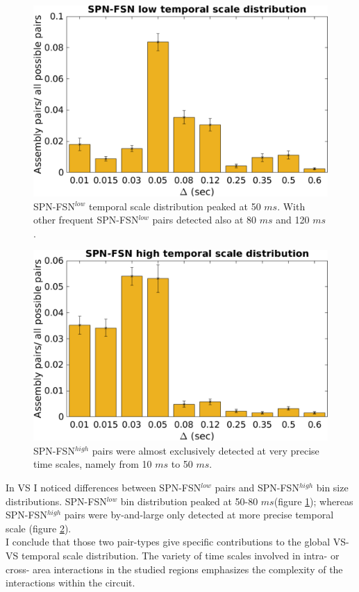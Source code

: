 \begin{figure}
    \centering
    \includegraphics[scale=0.54]{figures/SPN_FSNlow1.pdf}
    \caption{SPN-FSN$^{low}$ temporal scale distribution peaked at 50 $ms$. With other frequent SPN-FSN$^{low}$ pairs detected also at 80 $ms$ and 120 $ms$.}
    \label{fig:SPN_FSNlowBin}
\end{figure}
\begin{figure}
    \centering
    \includegraphics[scale=0.54]{figures/SPN_FSNhigh1.pdf}
    \caption{SPN-FSN$^{high}$ pairs were almost exclusively detected at very precise time scales, namely from 10 $ms$ to 50 $ms$.}
    \label{fig:SPN_FSNhighBin}
\end{figure}
In VS I noticed differences between SPN-FSN$^{low}$ pairs and SPN-FSN$^{high}$ bin size distributions. SPN-FSN$^{low}$ bin distribution peaked at 50-80 $ms$(figure \ref{fig:SPN_FSNlowBin}); whereas SPN-FSN$^{high}$ pairs were by-and-large only detected at more precise temporal scale (figure \ref{fig:SPN_FSNhighBin}).\\ I conclude that those two pair-types give specific contributions to the global VS-VS temporal scale distribution. The variety of time scales involved in intra- or cross- area interactions in the studied regions emphasizes the complexity of the interactions within the circuit.
